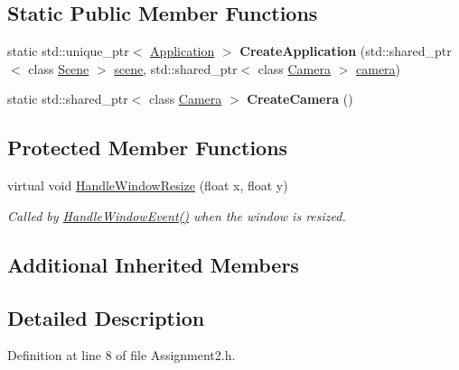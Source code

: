 \subsection*{Static Public Member Functions}
\begin{DoxyCompactItemize}
\item 
\hypertarget{class_assignment2_ae4f0035275d5be2c053a598fbe3209e6}{}static std\+::unique\+\_\+ptr$<$ \hyperlink{class_application}{Application} $>$ {\bfseries Create\+Application} (std\+::shared\+\_\+ptr$<$ class \hyperlink{class_scene}{Scene} $>$ \hyperlink{class_application_a88c6615107a5094bb93fa5f153f79554}{scene}, std\+::shared\+\_\+ptr$<$ class \hyperlink{class_camera}{Camera} $>$ \hyperlink{class_application_a0e8589fcb13c520ba472473abe5a518d}{camera})\label{class_assignment2_ae4f0035275d5be2c053a598fbe3209e6}

\item 
\hypertarget{class_assignment2_a285e6d6ff330c03e28e49660ec178fa4}{}static std\+::shared\+\_\+ptr$<$ class \hyperlink{class_camera}{Camera} $>$ {\bfseries Create\+Camera} ()\label{class_assignment2_a285e6d6ff330c03e28e49660ec178fa4}

\end{DoxyCompactItemize}
\subsection*{Protected Member Functions}
\begin{DoxyCompactItemize}
\item 
virtual void \hyperlink{class_assignment2_a1af734567de5e8e73a2fd726fe3914f2}{Handle\+Window\+Resize} (float x, float y)
\begin{DoxyCompactList}\small\item\em Called by \hyperlink{class_application_a74d92db64e051efa56d0357989dcb755}{Handle\+Window\+Event()} when the window is resized. \end{DoxyCompactList}\end{DoxyCompactItemize}
\subsection*{Additional Inherited Members}


\subsection{Detailed Description}


Definition at line 8 of file Assignment2.\+h.



